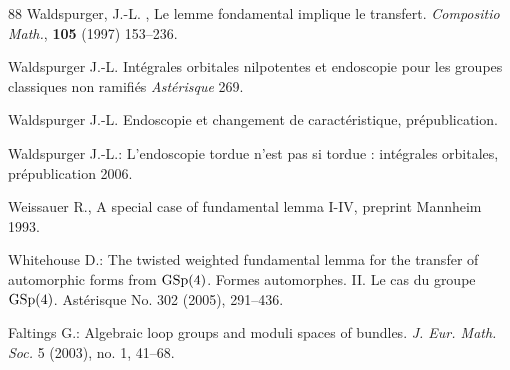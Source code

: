 \documentclass[12pt,english]{smfart}
\numberwithin{equation}{subsection}
\theoremstyle{remark}
\begin{document}
\begin{thebibliography}{88}
 Waldspurger, J.-L. , {Le lemme fondamental
implique le transfert.} \emph{Compositio Math.}, \textbf{105} (1997)
153--236.

  Waldspurger J.-L. {Int\'egrales orbitales nilpotentes et
    endoscopie pour les groupes classiques non ramifi\'es} {\em Ast\'erisque}
    269.

  Waldspurger J.-L. {Endoscopie et changement de
    caract\'eristique}, pr\'epublication.

  Waldspurger J.-L.: {L'endoscopie tordue n'est pas si
    tordue : int\'egrales orbitales}, pr\'epublication 2006.

 Weissauer R., {A special case of fundamental lemma I-IV,}
    preprint Mannheim 1993.

 Whitehouse D.: {The twisted weighted fundamental lemma
    for the transfer of automorphic forms from $\rm GSp(4)$}. Formes
    automorphes. II. Le cas du groupe $\rm GSp(4)$.  Ast\'erisque  No. 302
    (2005), 291--436.

 Faltings G.: Algebraic loop groups and moduli spaces of bundles.
{\em J. Eur. Math. Soc.}   5  (2003),  no. 1, 41--68.

\end{thebibliography}
\end{document}
